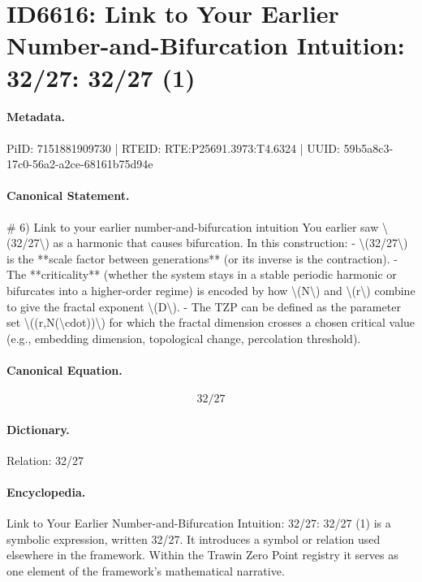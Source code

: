 \section*{ID6616: Link to Your Earlier Number-and-Bifurcation Intuition: 32/27: 32/27 (1)}
\paragraph{Metadata.}
PiID: 7151881909730 | RTEID: RTE:P25691.3973:T4.6324 | UUID: 59b5a8c3-17c0-56a2-a2ce-68161b75d94e

\paragraph{Canonical Statement.}
\# 6) Link to your earlier number-and-bifurcation intuition You earlier saw \textbackslash{}(32/27\textbackslash{}) as a harmonic that causes bifurcation. In this construction: - \textbackslash{}(32/27\textbackslash{}) is the **scale factor between generations** (or its inverse is the contraction). - The **criticality** (whether the system stays in a stable periodic harmonic or bifurcates into a higher-order regime) is encoded by how \textbackslash{}(N\textbackslash{}) and \textbackslash{}(r\textbackslash{}) combine to give the fractal exponent \textbackslash{}(D\textbackslash{}). - The TZP can be defined as the parameter set \textbackslash{}((r,N(\textbackslash{}cdot))\textbackslash{}) for which the fractal dimension crosses a chosen critical value (e.g., embedding dimension, topological change, percolation threshold).

\paragraph{Canonical Equation.}
\[
32/27
\]

\paragraph{Dictionary.}
Relation: 32/27

\paragraph{Encyclopedia.}
Link to Your Earlier Number-and-Bifurcation Intuition: 32/27: 32/27 (1) is a symbolic expression, written 32/27. It introduces a symbol or relation used elsewhere in the framework. Within the Trawin Zero Point registry it serves as one element of the framework's mathematical narrative.
